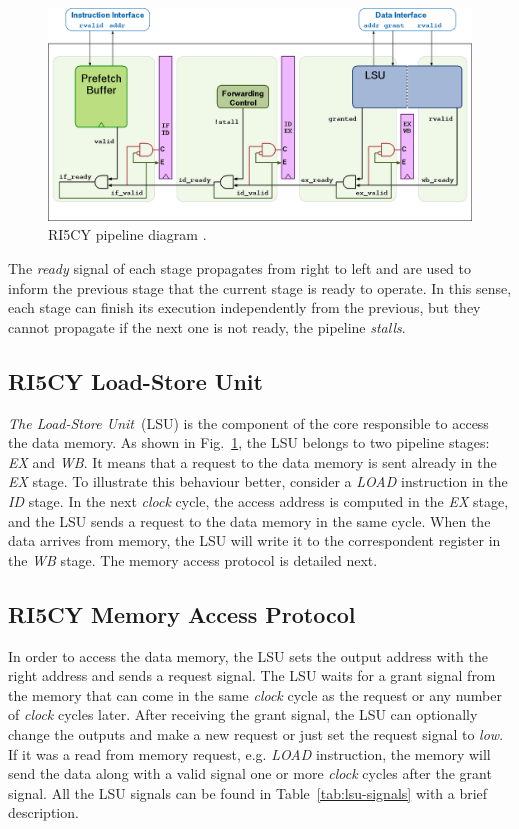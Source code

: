 \begin{figure}[htb!]
	\centering
	\includegraphics[width=\textwidth]{images/ri5cy_pipeline.png}
	\caption{RI5CY pipeline diagram \cite{manual-ri5cy}.}
	\label{fig:ri5cy_pipeline}
\end{figure}

The \textit{ready} signal of each stage propagates from right to left and are used to inform the previous stage that the current stage is ready to operate. In this sense, each stage can finish its execution independently from the previous, but they cannot propagate if the next one is not ready, the pipeline \textit{stalls}. 

\subsection*{RI5CY Load-Store Unit}

\textit{The Load-Store Unit}~(LSU) is the component of the core responsible to access the data memory. As shown in Fig.~\ref{fig:ri5cy_pipeline}, the LSU belongs to two pipeline stages: \textit{EX} and \textit{WB}. It means that a request to the data memory is sent already in the \textit{EX} stage. To illustrate this behaviour better, consider a \textit{LOAD} instruction in the \textit{ID} stage. In the next \textit{clock} cycle, the access address is computed in the \textit{EX} stage, and the LSU sends a request to the data memory in the same cycle. When the data arrives from memory, the LSU will write it to the correspondent register in the \textit{WB} stage. The memory access protocol is detailed next.

\subsection*{RI5CY Memory Access Protocol}

In order to access the data memory, the LSU sets the output address with the right address and sends a request signal. The LSU waits for a grant signal from the memory that can come in the same \textit{clock} cycle as the request or any number of \textit{clock} cycles later. After receiving the grant signal, the LSU can optionally change the outputs and make a new request or just set the request signal to \textit{low}. If it was a read from memory request, e.g. \textit{LOAD} instruction, the memory will send the data along with a valid signal one or more \textit{clock} cycles after the grant signal. All the LSU signals can be found in Table~\ref{tab:lsu-signals} with a brief description. 

